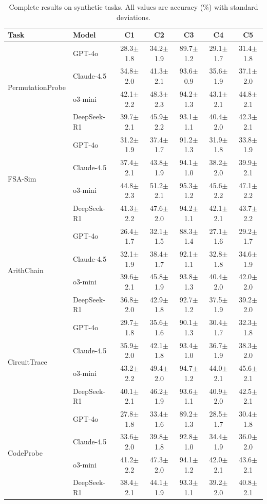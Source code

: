 \documentclass{article}
\theoremstyle{plain}
\theoremstyle{definition}
\theoremstyle{remark}
\begin{document}
\begin{table}[h]
\centering
\caption{Complete results on synthetic tasks. All values are accuracy (\%) with standard deviations.}
\label{tab:results_synthetic}
\small
\begin{tabular}{@{}llccccc@{}}
\toprule
\textbf{Task} & \textbf{Model} & \textbf{C1} & \textbf{C2} & \textbf{C3} & \textbf{C4} & \textbf{C5} \\
\midrule
\multirow{4}{*}{PermutationProbe} 
& GPT-4o & 28.3$\pm$1.8 & 34.2$\pm$1.9 & 89.7$\pm$1.2 & 29.1$\pm$1.7 & 31.4$\pm$1.8 \\
& Claude-4.5 & 34.8$\pm$2.0 & 41.3$\pm$2.1 & 93.6$\pm$0.9 & 35.6$\pm$1.9 & 37.1$\pm$2.0 \\
& o3-mini & 42.1$\pm$2.2 & 48.3$\pm$2.3 & 94.2$\pm$1.3 & 43.1$\pm$2.1 & 44.8$\pm$2.1 \\
& DeepSeek-R1 & 39.7$\pm$2.1 & 45.9$\pm$2.2 & 93.1$\pm$1.1 & 40.4$\pm$2.0 & 42.3$\pm$2.1 \\
\midrule
\multirow{4}{*}{FSA-Sim}
& GPT-4o & 31.2$\pm$1.9 & 37.4$\pm$1.7 & 91.2$\pm$1.3 & 31.9$\pm$1.8 & 33.8$\pm$1.9 \\
& Claude-4.5 & 37.4$\pm$2.1 & 43.8$\pm$1.9 & 94.1$\pm$1.0 & 38.2$\pm$2.0 & 39.9$\pm$2.1 \\
& o3-mini & 44.8$\pm$2.3 & 51.2$\pm$2.1 & 95.3$\pm$1.2 & 45.6$\pm$2.2 & 47.1$\pm$2.2 \\
& DeepSeek-R1 & 41.3$\pm$2.2 & 47.6$\pm$2.0 & 94.2$\pm$1.1 & 42.1$\pm$2.1 & 43.7$\pm$2.2 \\
\midrule
\multirow{4}{*}{ArithChain}
& GPT-4o & 26.4$\pm$1.7 & 32.1$\pm$1.5 & 88.3$\pm$1.4 & 27.1$\pm$1.6 & 29.2$\pm$1.7 \\
& Claude-4.5 & 32.1$\pm$1.9 & 38.4$\pm$1.7 & 92.1$\pm$1.1 & 32.8$\pm$1.8 & 34.6$\pm$1.9 \\
& o3-mini & 39.6$\pm$2.1 & 45.8$\pm$1.9 & 93.8$\pm$1.3 & 40.4$\pm$2.0 & 42.0$\pm$2.0 \\
& DeepSeek-R1 & 36.8$\pm$2.0 & 42.9$\pm$1.8 & 92.7$\pm$1.2 & 37.5$\pm$1.9 & 39.2$\pm$2.0 \\
\midrule
\multirow{4}{*}{CircuitTrace}
& GPT-4o & 29.7$\pm$1.8 & 35.6$\pm$1.6 & 90.1$\pm$1.3 & 30.4$\pm$1.7 & 32.3$\pm$1.8 \\
& Claude-4.5 & 35.9$\pm$2.0 & 42.1$\pm$1.8 & 93.4$\pm$1.0 & 36.7$\pm$1.9 & 38.3$\pm$2.0 \\
& o3-mini & 43.2$\pm$2.2 & 49.4$\pm$2.0 & 94.7$\pm$1.2 & 44.0$\pm$2.1 & 45.6$\pm$2.1 \\
& DeepSeek-R1 & 40.1$\pm$2.1 & 46.2$\pm$1.9 & 93.6$\pm$1.1 & 40.9$\pm$2.0 & 42.5$\pm$2.1 \\
\midrule
\multirow{4}{*}{CodeProbe}
& GPT-4o & 27.8$\pm$1.8 & 33.4$\pm$1.6 & 89.2$\pm$1.3 & 28.5$\pm$1.7 & 30.4$\pm$1.8 \\
& Claude-4.5 & 33.6$\pm$2.0 & 39.8$\pm$1.8 & 92.8$\pm$1.0 & 34.4$\pm$1.9 & 36.0$\pm$2.0 \\
& o3-mini & 41.2$\pm$2.2 & 47.3$\pm$2.0 & 94.1$\pm$1.2 & 42.0$\pm$2.1 & 43.6$\pm$2.1 \\
& DeepSeek-R1 & 38.4$\pm$2.1 & 44.1$\pm$1.9 & 93.3$\pm$1.1 & 39.2$\pm$2.0 & 40.8$\pm$2.1 \\
\bottomrule
\end{tabular}
\end{table}
\end{document}

